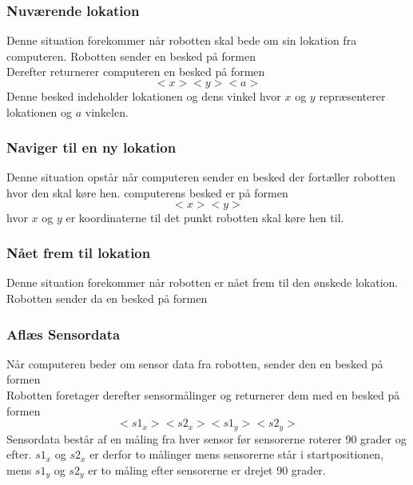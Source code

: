 \subsubsection{Nuværende lokation}\label{protokol:positur}
Denne situation forekommer når robotten skal bede om sin lokation fra computeren.
Robotten sender en besked på formen
\[<0>\]
Derefter returnerer computeren en besked på formen
\[<52><x><y><a>\]
Denne besked indeholder lokationen og dens vinkel hvor $x$ og $y$ repræsenterer lokationen og $a$ vinkelen.

\subsubsection{Naviger til en ny lokation}\label{design:protokol_navigertilny}
Denne situation opstår når computeren sender en besked der fortæller robotten hvor den skal køre hen.
computerens besked er på formen
 \[<50><x><y>\] 
hvor $x$ og $y$ er koordinaterne til det punkt robotten skal køre hen til.

\subsubsection{Nået frem til lokation}
Denne situation forekommer når robotten er nået frem til den ønskede lokation.
Robotten sender da en besked på formen \[<1>\]

\subsubsection{Aflæs Sensordata}
Når computeren beder om sensor data fra robotten, sender den en besked på formen \[<51>\]
Robotten foretager derefter sensormålinger og returnerer dem med en besked på formen  
\[<2><s1_x> <s2_x> <s1_y> <s2_y>\]
Sensordata består af en måling fra hver sensor før sensorerne roterer 90 grader og efter.
$ s1_x $ og $ s2_x $ er derfor to målinger mens sensorerne står i startpositionen, mens $ s1_y $ og $ s2_y $ er to måling efter sensorerne er drejet 90 grader.